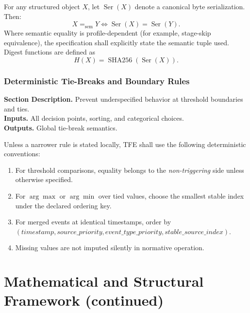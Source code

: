 \documentclass[11pt]{report}
\newcommand{\meta}[3]{\textbf{Section Description.} #1\\
\textbf{Inputs.} #2\\
\textbf{Outputs.} #3\par}
\begin{document}
For any structured object $X$, let $\operatorname{Ser}(X)$ denote a canonical byte serialization. Then:
\[
X =_{\mathrm{sem}} Y \iff \operatorname{Ser}(X)=\operatorname{Ser}(Y).
\]
Where semantic equality is profile-dependent (for example, stage-skip equivalence), the specification shall explicitly state the semantic tuple used. Digest functions are defined as
\[
H(X)=\operatorname{SHA256}(\operatorname{Ser}(X)).
\]

\section{Deterministic Tie-Breaks and Boundary Rules}
\meta{Prevent underspecified behavior at threshold boundaries and ties.}{All decision points, sorting, and categorical choices.}{Global tie-break semantics.}

Unless a narrower rule is stated locally, TFE shall use the following deterministic conventions:
\begin{enumerate}[leftmargin=1.2cm]
\item For threshold comparisons, equality belongs to the \emph{non-triggering} side unless otherwise specified.
\item For $\arg\max$ or $\arg\min$ over tied values, choose the smallest stable index under the declared ordering key.
\item For merged events at identical timestamps, order by $(timestamp, source\_priority, event\_type\_priority, stable\_source\_index)$.
\item Missing values are not imputed silently in normative operation.
\end{enumerate}


\part{Mathematical and Structural Framework (continued)}
\end{document}
